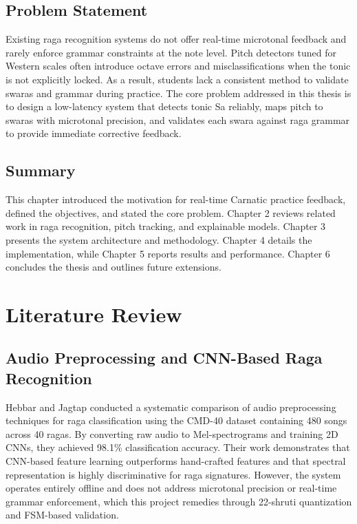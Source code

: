 \documentclass[12pt,a4paper]{report}
\numberwithin{equation}{chapter}
\begin{document}
\section{Problem Statement}
Existing raga recognition systems do not offer real-time microtonal feedback and rarely enforce grammar constraints at the note level. Pitch detectors tuned for Western scales often introduce octave errors and misclassifications when the tonic is not explicitly locked. As a result, students lack a consistent method to validate swaras and grammar during practice. The core problem addressed in this thesis is to design a low-latency system that detects tonic Sa reliably, maps pitch to swaras with microtonal precision, and validates each swara against raga grammar to provide immediate corrective feedback.

\section{Summary}
This chapter introduced the motivation for real-time Carnatic practice feedback, defined the objectives, and stated the core problem. Chapter 2 reviews related work in raga recognition, pitch tracking, and explainable models. Chapter 3 presents the system architecture and methodology. Chapter 4 details the implementation, while Chapter 5 reports results and performance. Chapter 6 concludes the thesis and outlines future extensions.

\chapter{Literature Review}

\section{Audio Preprocessing and CNN-Based Raga Recognition}
Hebbar and Jagtap \cite{hebbar2023comparison} conducted a systematic comparison of audio preprocessing techniques for raga classification using the CMD-40 dataset containing 480 songs across 40 ragas. By converting raw audio to Mel-spectrograms and training 2D CNNs, they achieved 98.1\% classification accuracy. Their work demonstrates that CNN-based feature learning outperforms hand-crafted features and that spectral representation is highly discriminative for raga signatures. However, the system operates entirely offline and does not address microtonal precision or real-time grammar enforcement, which this project remedies through 22-shruti quantization and FSM-based validation.
\end{document}
